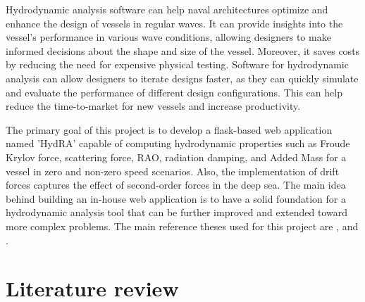 Hydrodynamic analysis software can help naval architectures optimize and enhance the design of 
vessels in regular waves. It can provide insights into the vessel's performance in various 
wave conditions, 
allowing designers to make informed decisions about the shape and size of the vessel. 
Moreover, it saves costs by reducing the need for expensive physical testing.
Software for hydrodynamic analysis can allow designers to iterate designs faster, 
as they can quickly simulate and evaluate the performance of different design configurations. 
This can help reduce the time-to-market for new vessels and increase productivity.

The primary goal of this project is to develop a flask-based web application named 'HydRA' 
capable of computing hydrodynamic properties such as Froude Krylov force, scattering force, 
RAO, radiation damping, and Added Mass for a vessel in zero and non-zero speed scenarios.
Also, the implementation of drift forces captures the effect of second-order forces in 
the deep sea. The main idea behind building an in-house web application is to have a 
solid foundation for a hydrodynamic analysis tool that can be further improved and 
extended toward more complex problems. The main reference theses used for this project 
are \citet{guha2015estimation}, and \cite{guha2012development}.

\section{Literature review}

